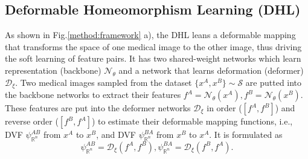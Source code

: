 \subsection{Deformable Homeomorphism Learning (DHL)}
\label{sec:dhl}
As shown in Fig.\ref{method:framework} a), the DHL leans a deformable mapping that transforms the space of one medical image to the other image, thus driving the soft learning of feature pairs. It has two shared-weight networks which learn representation (backbone) $\mathcal{N}_{\theta}$ and a network that learns deformation (deformer) $\mathcal{D}_{\xi}$. Two medical images sampled from the dataset $\{x^{A},x^{B}\}\sim\mathcal{S}$ are putted into the backbone networks to extract their features $f^{A}=\mathcal{N}_{\theta}(x^{A}),f^{B}=\mathcal{N}_{\theta}(x^{B})$. These features are put into the deformer networks $\mathcal{D}_{\xi}$ in order ($[f^{A},f^{B}]$) and reverse order ($[f^{B},f^{A}]$) to estimate their deformable mapping functions, i.e., DVF $\psi_{\mathbb{R}^{n}}^{AB}$ from $x^{A}$ to $x^{B}$, and DVF $\psi_{\mathbb{R}^{n}}^{BA}$ from $x^{B}$ to $x^{A}$. It is formulated as
\begin{equation}\label{equ:DHL}
\psi^{AB}_{\mathbb{R}^{n}}=\mathcal{D}_{\xi}(f^{A},f^{B}),\psi^{BA}_{\mathbb{R}^{n}}=\mathcal{D}_{\xi}(f^{B},f^{A}).
\end{equation}

